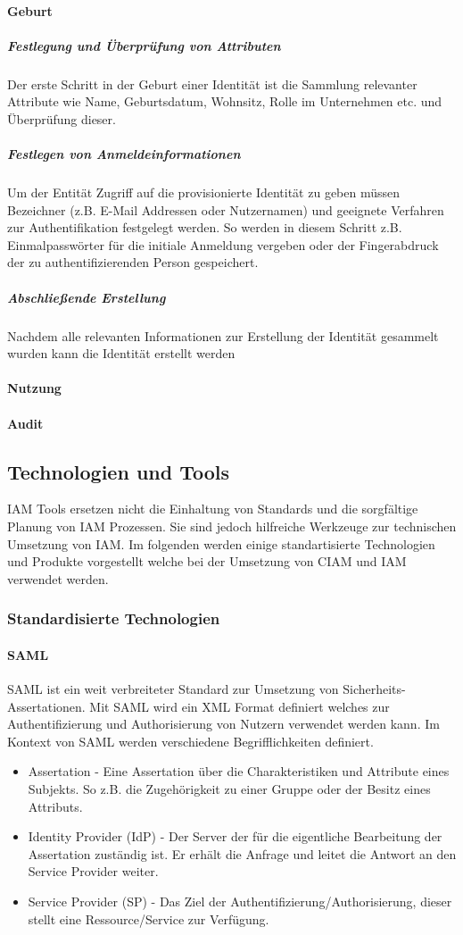 \documentclass[11pt]{article}
\begin{document}
\paragraph{Geburt}
\subparagraph{Festlegung und Überprüfung von Attributen}
Der erste Schritt in der Geburt einer Identität ist die Sammlung relevanter Attribute wie Name, Geburtsdatum, Wohnsitz, Rolle im Unternehmen etc. und Überprüfung dieser.
\subparagraph{Festlegen von Anmeldeinformationen}
Um der Entität Zugriff auf die provisionierte Identität zu geben müssen Bezeichner (z.B. E-Mail Addressen oder Nutzernamen) und geeignete Verfahren zur Authentifikation festgelegt werden. So werden in diesem Schritt z.B. Einmalpasswörter für die initiale Anmeldung vergeben oder der Fingerabdruck der zu authentifizierenden Person gespeichert.
\subparagraph{Abschließende Erstellung}
Nachdem alle relevanten Informationen zur Erstellung der Identität gesammelt wurden kann die Identität erstellt werden
\paragraph{Nutzung}
\paragraph{Audit}
\subsection{Technologien und Tools}
IAM Tools ersetzen nicht die Einhaltung von Standards und die sorgfältige Planung von IAM Prozessen. Sie sind jedoch hilfreiche Werkzeuge zur technischen Umsetzung von IAM. Im folgenden werden einige standartisierte Technologien und Produkte vorgestellt welche bei der Umsetzung von CIAM und IAM verwendet werden.
\subsubsection{Standardisierte Technologien}
\paragraph{SAML}
SAML ist ein weit verbreiteter Standard zur Umsetzung von Sicherheits-Assertationen. Mit SAML wird ein XML Format definiert welches zur Authentifizierung und Authorisierung von Nutzern verwendet werden kann. Im Kontext von SAML werden verschiedene Begrifflichkeiten definiert.
\begin{itemize}
  \item Assertation - Eine Assertation über die Charakteristiken und Attribute eines Subjekts. So z.B. die Zugehörigkeit zu einer Gruppe oder der Besitz eines Attributs.
  \item Identity Provider (IdP) - Der Server der für die eigentliche Bearbeitung der Assertation zuständig ist. Er erhält die Anfrage und leitet die Antwort an den Service Provider weiter.
  \item Service Provider (SP) - Das Ziel der Authentifizierung/Authorisierung, dieser stellt eine Ressource/Service zur Verfügung.
\end{itemize}
~\cite{hughes2005security}
\end{document}
